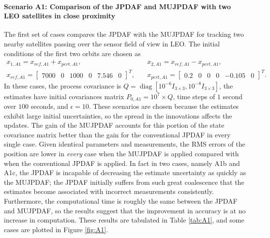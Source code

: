 \documentclass[letterpaper, paper,10pt]{AAS}		%
\newcommand{\diag}{\mathop{\mathrm{diag}}\nolimits}
\begin{document}
\paragraph*{Scenario A1: Comparison of the JPDAF and MUJPDAF with two LEO satellites in close proximity}

The first set of cases compares the JPDAF with the MUJPDAF for tracking two nearby satellites passing over the sensor field of view in LEO. The initial conditions of the first two orbits are chosen as
\begin{align}
x_{1,A1}=x_{ref,A1}+x_{pert,A1},& \quad x_{2,A1}=x_{ref,A1}-x_{pert,A1},\nonumber
\\
x_{ref,A1}=\begin{bmatrix}7000 & 0 & 1000 & 0 & 7.546 & 0\end{bmatrix}^T,& \quad x_{pert,A1}=\begin{bmatrix}
0.2 & 0 & 0 & 0 & -0.105 & 0
\end{bmatrix}^T.
\end{align}
In these cases, the process covariance is $Q=\diag[10^{-6}I_{3\times3}, 10^{-8}I_{3\times3}]$, the estimates have initial covariances matrix $P_{0,A1}=10^7\times Q$, time steps of $1$ second over $100$ seconds, and $\epsilon=10$.
These scenarios are chosen because the estimates exhibit large initial uncertainties, so the spread in the innovations affects the updates.
The gain of the MUJPDAF accounts for this portion of the state covariance matrix better than the gain for the conventional JPDAF in every single case.
Given identical parameters and measurements, the RMS errors of the position are lower in \emph{every} case when the MUJPDAF is applied compared with when the conventional JPDAF is applied.
In fact in two cases, namely A1b and A1c, the JPDAF is incapable of decreasing the estimate uncertainty as quickly as the MUJPDAF; the JPDAF initially suffers from such great coalescence that the estimates become associated with incorrect measurements consistently.
Furthermore, the computational time is roughly the same between the JPDAF and MUJPDAF, so the results suggest that the improvement in accuracy is at no increase in computation.
These results are tabulated in Table \ref{tab:A1}, and some cases are plotted in Figure \ref{fig:A1}.
\end{document}
